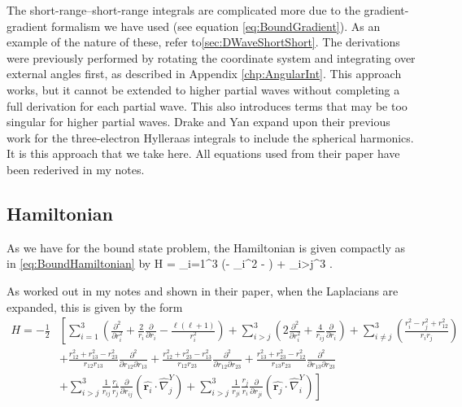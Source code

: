 \documentclass[Dissertation.tex]{subfiles}
\begin{document}
The short-range--short-range integrals are complicated more due to the 
gradient-gradient formalism we have used (see equation \ref{eq:BoundGradient}).
As an example of the nature of these, refer to\cref{sec:DWaveShortShort}.
The derivations were previously performed by rotating 
the coordinate system and integrating over external angles first, as 
described in Appendix \ref{chp:AngularInt}. This approach works, but it 
cannot be extended to higher partial waves without completing a full 
derivation for each partial wave. This also introduces terms that may be too 
singular for higher partial waves. Drake and Yan \cite{Yan1997} expand upon 
their previous work for the three-electron Hylleraas integrals to include the 
spherical harmonics. It is this approach that we take here. All equations 
used from their paper have been rederived in my notes.


\subsection{Hamiltonian}
\label{sec:GenShortHam}
As we have for the bound state problem, the Hamiltonian is given compactly
as in \cref{eq:BoundHamiltonian} by
\beq
\label{eq:GenHam1}
H = \sum_{i=1}^3 \left(- \nabla_i^2 -  \right) + \sum_{i>j}^3 .
\eeq

\noindent As worked out in my notes and shown in their paper, when the Laplacians are expanded, this is given by the form
\begin{align}
\label{eq:GenHam2}
\nonumber H = -\frac{1}{2} & \left[ \sum_{i=1}^3 \left( \frac{\partial^2}{\partial r_i^2} + \frac{2}{r_i} \frac{\partial}{\partial r_i} - \frac{\ell(\ell+1)}{r_i^2} \right) + \sum_{i>j}^3 \left( 2 \frac{\partial^2}{\partial r_i^2} + \frac{4}{r_{ij}} \frac{\partial}{\partial r_i} \right) + \sum_{i \neq j}^3 \left(\frac{r_i^2 - r_j^2 + r_{12}^2}{r_i r_j} \right) \right. \\
\nonumber &  \left. + \frac{r_{12}^2 + r_{13}^2 - r_{23}^2}{r_{12} r_{13}} \frac{\partial^2}{\partial r_{12} \partial r_{13}} + \frac{r_{12}^2 + r_{23}^2 - r_{13}^2}{r_{12} r_{23}} \frac{\partial^2}{\partial r_{12} \partial r_{23}} + \frac{r_{13}^2 + r_{23}^2 - r_{12}^2}{r_{13} r_{23}} \frac{\partial^2}{\partial r_{13} \partial r_{23}} \right. \\
& \left. + \sum_{i>j}^3 \frac{1}{r_{ij}} \frac{r_i}{r_j} \frac{\partial}{\partial r_{ij}} \left( \hat{\boldsymbol{r}_i} \cdot \hat{\nabla}_j^Y \right) + \sum_{i>j}^3 \frac{1}{r_{ji}} \frac{r_j}{r_i} \frac{\partial}{\partial r_{ji}} \left( \hat{\boldsymbol{r}_j} \cdot \hat{\nabla}_i^Y \right) \right]
\end{align}
\end{document}
